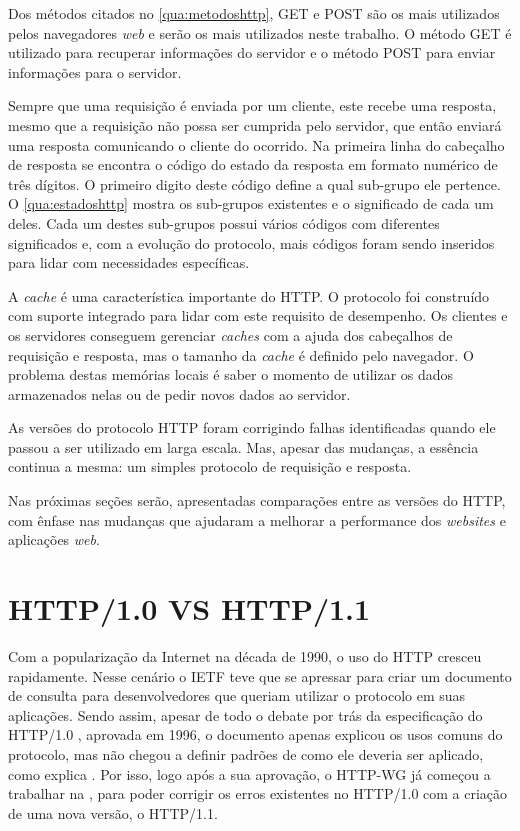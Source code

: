 

Dos métodos citados no \autoref{qua:metodoshttp}, GET e POST são os mais utilizados pelos navegadores \textit{web} e serão os mais utilizados neste trabalho. O método GET é utilizado para recuperar informações do servidor e o método POST para enviar informações para o servidor.

Sempre que uma requisição é enviada por um cliente, este recebe uma resposta, mesmo que a requisição não possa ser cumprida pelo servidor, que então enviará uma resposta comunicando o cliente do ocorrido. Na primeira linha do cabeçalho de resposta se encontra o código do estado da resposta em formato numérico de três dígitos. O primeiro digito deste código define a qual sub-grupo ele pertence. O \autoref{qua:estadoshttp} mostra os sub-grupos existentes e o significado de cada um deles. Cada um destes sub-grupos possui vários códigos  com diferentes significados e, com a evolução do protocolo, mais códigos foram sendo inseridos para lidar com necessidades específicas.



A \textit{cache} é uma característica importante do HTTP. O protocolo foi construído com suporte integrado para lidar com este requisito de desempenho. Os clientes e os servidores conseguem gerenciar \textit{caches} com a ajuda dos cabeçalhos de requisição e resposta, mas o tamanho da \textit{cache} é definido pelo navegador. O problema destas memórias locais é saber o momento de utilizar os dados armazenados nelas ou de pedir novos dados ao servidor.

As versões do protocolo HTTP foram corrigindo falhas identificadas quando ele passou a ser utilizado em larga escala. Mas, apesar das mudanças, a essência continua a mesma: um simples protocolo de requisição e resposta.

Nas próximas seções serão, apresentadas comparações entre as versões do HTTP, com ênfase nas mudanças que ajudaram a melhorar a performance dos \textit{websites} e aplicações \textit{web}.

\section{HTTP/1.0 VS HTTP/1.1}
\label{sec:http_10_vs_http_11}

Com a popularização da Internet na década de 1990, o uso do HTTP cresceu rapidamente. Nesse cenário o IETF teve que se apressar para criar um documento de consulta para desenvolvedores que queriam utilizar o protocolo em suas aplicações. Sendo assim, apesar de todo o debate por trás da especificação do HTTP/1.0 \cite{RFC1945}, aprovada em 1996, o documento apenas explicou os usos comuns do protocolo, mas não chegou a definir padrões de como ele deveria ser aplicado, como explica \cite{KeyDifferencesHTTP}. Por isso, logo após a sua aprovação, o HTTP-WG já começou a trabalhar na \cite{RFC2616}, para poder corrigir os erros existentes no HTTP/1.0 com a criação de uma nova versão, o HTTP/1.1.

